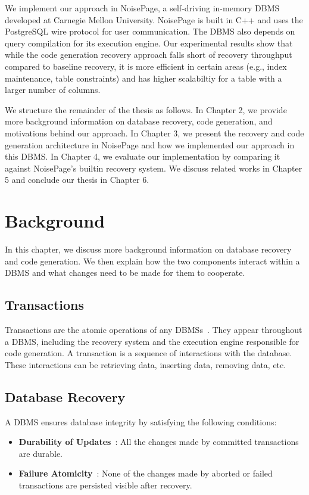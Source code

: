 \documentclass[12pt]{cmuthesis}
\begin{document}
We implement our approach in NoisePage\cite{noisepage}, a self-driving in-memory DBMS developed at Carnegie Mellon University. NoisePage is built in C++ and uses the PostgreSQL wire protocol for user communication. The DBMS also depends on query compilation for its execution engine. Our experimental results show that while the code generation recovery approach falls short of recovery throughput compared to baseline recovery, it is more efficient in certain areas (e.g., index maintenance, table constraints) and has higher scalabiltiy for a table with a larger number of columns.

We structure the remainder of the thesis as follows. In Chapter 2, we provide more background information on database recovery, code generation, and motivations behind our approach. In Chapter 3, we present the recovery and code generation architecture in NoisePage and how we implemented our approach in this DBMS. In Chapter 4, we evaluate our implementation by comparing it against NoisePage's builtin recovery system. We discuss related works in Chapter 5 and conclude our thesis in Chapter 6.

\chapter{Background}
In this chapter, we discuss more background information on database recovery and code generation. We then explain how the two components interact within a DBMS and what changes need to be made for them to cooperate.

\section{Transactions}
Transactions are the atomic operations of any DBMSs~\cite{theo83}. They appear throughout a DBMS, including the recovery system and the execution engine responsible for code generation. A transaction is a sequence of interactions with the database. These interactions can be retrieving data, inserting data, removing data, etc. 

\section{Database Recovery}
A DBMS ensures database integrity by satisfying the following conditions:
\begin{itemize}
    \item \textbf{Durability of Updates}~\cite{agrawal89}: All the changes made by committed transactions are durable.
    \item \textbf{Failure Atomicity}~\cite{franklin97}: None of the changes made by aborted or failed transactions are persisted visible after recovery.
\end{itemize}
\end{document}
